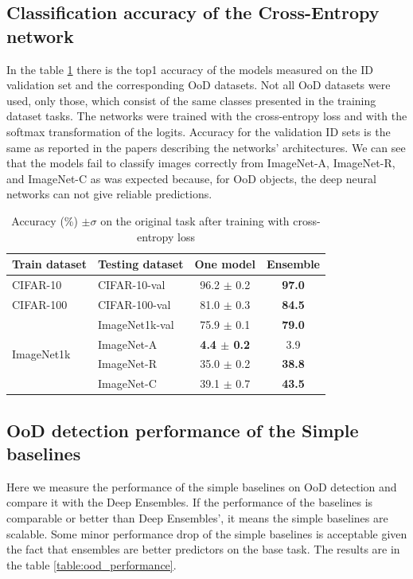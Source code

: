 \documentclass{article}
\begin{document}
\subsection{Classification accuracy of the Cross-Entropy network}
In the table \ref{table:accuracy} there is the top1 accuracy of the models measured on the ID validation set and the corresponding OoD datasets.
Not all OoD datasets were used, only those, which consist of the same classes presented in the training dataset tasks.
The networks were trained with the cross-entropy loss and with the softmax transformation of the logits.
Accuracy for the validation ID sets is the same as reported in the papers describing the networks' architectures.
We can see that the models fail to classify images correctly from ImageNet-A, ImageNet-R, and ImageNet-C as was expected because, for OoD objects, the deep neural networks can not give reliable predictions.

\begin{table}[H]
  \caption{Accuracy (\%) $\pm \sigma$ on the original task after training with cross-entropy loss}
  \label{table:accuracy}
  \vskip 0.15in
  \begin{center}
  \begin{small}
    \begin{tabular}{ l | l | c c }
      \toprule
      Train dataset & Testing dataset & One model & Ensemble \\ \midrule
      CIFAR-10      & CIFAR-10-val    & 96.2 {\tiny $\pm$ 0.2} & \bf{97.0} \\
      CIFAR-100     & CIFAR-100-val   & 81.0 {\tiny $\pm$ 0.3} & \bf{84.5} \\
      \midrule
      \multirow{4}{*}{ImageNet1k} & ImageNet1k-val & 75.9 {\tiny $\pm$ 0.1} & \bf{79.0} \\
      & ImageNet-A & \bf{4.4} {\tiny $\pm$ 0.2} & 3.9 \\
      & ImageNet-R & 35.0 {\tiny $\pm$ 0.2} & \bf{38.8} \\
      & ImageNet-C & 39.1 {\tiny $\pm$ 0.7} & \bf{43.5} \\
      \bottomrule
    \end{tabular}
  \end{small}
  \end{center}
\end{table}

\subsection{OoD detection performance of the Simple baselines}
Here we measure the performance of the simple baselines on OoD detection and compare it with the Deep Ensembles.
If the performance of the baselines is comparable or better than Deep Ensembles', it means the simple baselines are scalable.
Some minor performance drop of the simple baselines is acceptable given the fact that ensembles are better predictors on the base task.
The results are in the table \ref{table:ood_performance}.
\end{document}
